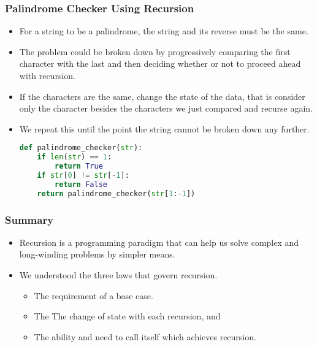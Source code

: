 \documentclass{beamer}
\begin{document}
\begin{frame}[fragile]
\frametitle{Palindrome Checker Using Recursion}
\begin{itemize}
\item For a string to be a palindrome, the string and its reverse must be the same.
\item The problem could be broken down by progressively comparing the first character with the last and then deciding whether or not to proceed ahead with recursion.
\item If the characters are the same, change the state of the data, that is consider only the character besides the characters we just compared and recurse again.
\item We repeat this until the point the string cannot be broken down any further. 
\begin{lstlisting}[language=Python]
def palindrome_checker(str):
    if len(str) == 1: 
        return True
    if str[0] != str[-1]: 
        return False
    return palindrome_checker(str[1:-1])
\end{lstlisting}
\end{itemize}
\end{frame}

\begin{frame}
\frametitle{Summary}
\begin{itemize}
\item Recursion is a programming paradigm that can help us solve  complex and long-winding problems by simpler means.
\item We understood the three laws that govern recursion.
\begin{itemize}
\item The requirement of a base case.
\item The The change of state with each recursion, and
\item The ability and need to call itself which achieves recursion.
\end{itemize} 
\end{itemize}
\end{frame}
\end{document}
